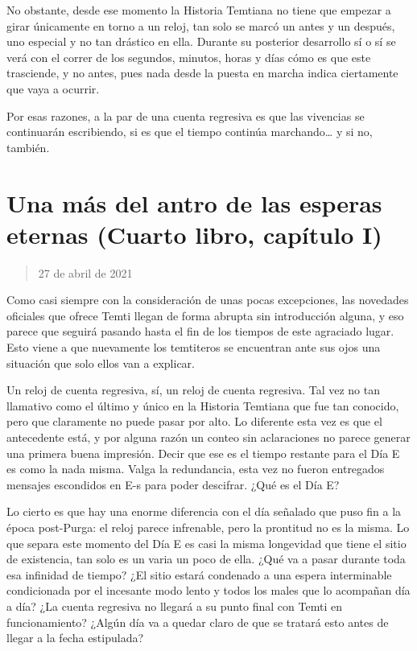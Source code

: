 \documentclass[
]{book}
\begin{document}
No obstante, desde ese momento la Historia Temtiana no tiene que empezar a girar únicamente en torno a un reloj, tan solo se marcó un antes y un después, uno especial y no tan drástico en ella. Durante su posterior desarrollo sí o sí se verá con el correr de los segundos, minutos, horas y días cómo es que este trasciende, y no antes, pues nada desde la puesta en marcha indica ciertamente que vaya a ocurrir.

Por esas razones, a la par de una cuenta regresiva es que las vivencias se continuarán escribiendo, si es que el tiempo continúa marchando\ldots{} y si no, también.

\hypertarget{una-muxe1s-del-antro-de-las-esperas-eternas-cuarto-libro-capuxedtulo-i}{%
\section{Una más del antro de las esperas eternas (Cuarto libro, capítulo I)}\label{una-muxe1s-del-antro-de-las-esperas-eternas-cuarto-libro-capuxedtulo-i}}

\begin{quote}
27 de abril de 2021
\end{quote}

Como casi siempre con la consideración de unas pocas excepciones, las novedades oficiales que ofrece Temti llegan de forma abrupta sin introducción alguna, y eso parece que seguirá pasando hasta el fin de los tiempos de este agraciado lugar. Esto viene a que nuevamente los temtiteros se encuentran ante sus ojos una situación que solo ellos van a explicar.

Un reloj de cuenta regresiva, sí, un reloj de cuenta regresiva. Tal vez no tan llamativo como el último y único en la Historia Temtiana que fue tan conocido, pero que claramente no puede pasar por alto. Lo diferente esta vez es que el antecedente está, y por alguna razón un conteo sin aclaraciones no parece generar una primera buena impresión. Decir que ese es el tiempo restante para el Día E es como la nada misma. Valga la redundancia, esta vez no fueron entregados mensajes escondidos en E-s para poder descifrar. ¿Qué es el Día E?

Lo cierto es que hay una enorme diferencia con el día señalado que puso fin a la época post-Purga: el reloj parece infrenable, pero la prontitud no es la misma. Lo que separa este momento del Día E es casi la misma longevidad que tiene el sitio de existencia, tan solo es un varia un poco de ella. ¿Qué va a pasar durante toda esa infinidad de tiempo? ¿El sitio estará condenado a una espera interminable condicionada por el incesante modo lento y todos los males que lo acompañan día a día? ¿La cuenta regresiva no llegará a su punto final con Temti en funcionamiento? ¿Algún día va a quedar claro de que se tratará esto antes de llegar a la fecha estipulada?
\end{document}
